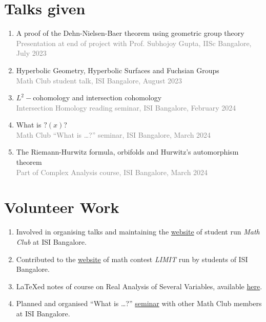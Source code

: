 \documentclass[a4paper, oneside, final]{scrartcl} %
\begin{document}
\section{Talks given}

\begin{enumerate}[label = $\bullet$]
  \item A proof of the Dehn-Nielsen-Baer theorem using geometric group theory \\
        \textcolor{grey}{Presentation at end of project with Prof. Subhojoy Gupta, IISc Bangalore, July 2023}
  \item Hyperbolic Geometry, Hyperbolic Surfaces and Fuchsian Groups \\
        \textcolor{grey}{Math Club student talk, ISI Bangalore, August 2023}
  \item \( L^2- \)cohomology and intersection cohomology \\
        \textcolor{grey}{Intersection Homology reading seminar, ISI Bangalore, February 2024}
  \item What is \( ?(x) \)? \\
        \textcolor{grey}{Math Club ``What is \dots ?'' seminar, ISI Bangalore, March 2024}

  \item The Riemann-Hurwitz formula, orbifolds and Hurwitz's automorphism theorem\\
        \textcolor{grey}{Part of Complex Analysis course, ISI Bangalore, March 2024}
\end{enumerate}


\section{Volunteer Work}

\begin{enumerate}[label = $\bullet$]
  \item Involved in organising talks and maintaining the \href{https://mathclubisib.github.io}{website} of student run \textit{Math Club} at ISI Bangalore.
  \item Contributed to the \href{https://www.limitisi.in}{website} of math contest \textit{LIMIT} run by students of ISI Bangalore.
  \item LaTeXed notes of course on Real Analysis of Several Variables, available \href{https://awnathan1893.github.io/Analysis3_Notes/}{here}.
  \item Planned and organised ``What is \dots ?'' \href{https://mathclubisib.github.io/seminars/what_is/}{seminar} with other Math Club members at ISI Bangalore.

\end{enumerate}

\end{document}
